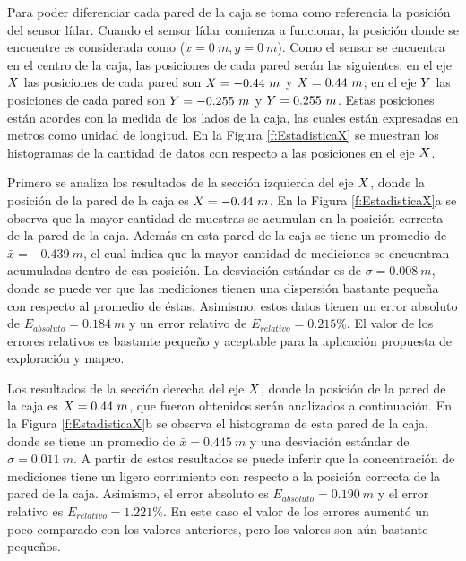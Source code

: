 Para poder diferenciar cada pared de la caja se toma como referencia la posición 
del sensor lídar. Cuando el sensor lídar comienza a funcionar, la posición donde
se encuentre es considerada como ($x = 0~m, y = 0~m$). Como el sensor
se encuentra en el centro de la caja, las posiciones de cada pared serán las 
siguientes: en el eje $\mathnormal X$ las posiciones de cada pared son $\mathnormal X = -0.44~m$ 
y $\mathnormal X = 0.44~m$; en el eje $\mathnormal Y$ las posiciones de cada pared son 
$\mathnormal Y = -0.255~m$ y $\mathnormal Y = 0.255~m$. Estas posiciones están acordes con la medida
de los lados de la caja, las cuales están expresadas en metros como unidad 
de longitud. En la Figura \ref{f:EstadisticaX} se muestran los histogramas de 
la cantidad de datos con respecto a las posiciones en el eje $\mathnormal X$.

Primero se analiza los resultados de la sección izquierda del eje $\mathnormal X$, donde 
la posición de la pared de la caja es $\mathnormal X = -0.44~m$. En la Figura 
\ref{f:EstadisticaX}a se observa que la mayor cantidad de muestras se acumulan en 
la posición correcta de la pared de la caja. Además en esta pared de la caja se 
tiene un promedio de $\bar{x} = -0.439~m$, el cual indica que la mayor cantidad de 
mediciones se encuentran acumuladas dentro de esa posición. La desviación estándar 
es de $\sigma = 0.008~m$, donde se puede ver que las mediciones tienen una dispersión 
bastante pequeña con respecto al promedio de éstas. Asimismo, estos datos tienen un 
error absoluto de $E_{absoluto} = 0.184~m$ y un error relativo de $E_{relativo} = 
0.215\%$. El valor de los errores relativos es bastante pequeño y aceptable para la 
aplicación propuesta de exploración y mapeo.

Los resultados de la sección derecha del eje $\mathnormal X$, donde la posición de la
pared de la caja es $\mathnormal X = 0.44~m$, que fueron obtenidos serán analizados a 
continuación. En la Figura \ref{f:EstadisticaX}b se observa el histograma de esta 
pared de la caja, donde se tiene un promedio de $\bar{x} = 0.445~m$ y una desviación 
estándar de $\sigma = 0.011~m$. A partir de estos resultados se puede inferir que 
la concentración de mediciones tiene un ligero corrimiento con respecto a la 
posición correcta de la pared de la caja. Asimismo, el error absoluto es 
$E_{absoluto} = 0.190~m$ y el error relativo es $E_{relativo} = 1.221\%$. En este 
caso el valor de los errores aumentó un poco comparado con los valores anteriores, pero 
los valores son aún bastante pequeños.



